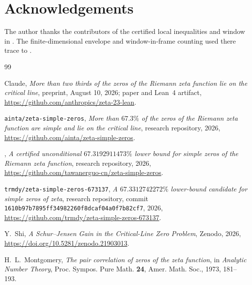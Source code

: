 \documentclass[11pt]{amsart}
\theoremstyle{remark}
\begin{document}
\section*{Acknowledgements}

The author thanks the contributors of the certified local inequalities and
window in \cite{Trmdy2026}.  The finite-dimensional envelope and
window-in-frame counting used there trace to \cite{Tawan2026}.

\begin{thebibliography}{99}

Claude,
\emph{More than two thirds of the zeros of the Riemann zeta function lie on
the critical line}, preprint, August 10, 2026; paper and Lean~4 artifact,
\url{https://github.com/anthropics/zeta-23-lean}.

\texttt{ainta/zeta-simple-zeros},
\emph{More than $67.3\%$ of the zeros of the Riemann zeta function are
simple and lie on the critical line}, research repository, 2026,
\url{https://github.com/ainta/zeta-simple-zeros}.

,
\emph{A certified unconditional $67.3192911473\%$ lower bound for simple
zeros of the Riemann zeta function}, research repository, 2026,
\url{https://github.com/tawanerguo-cn/zeta-simple-zeros}.

\texttt{trmdy/zeta-simple-zeros-673137},
\emph{A $67.3312742272\%$ lower-bound candidate for simple zeros of zeta},
research repository, commit
\texttt{1610b97b7895ff34982260f8dcaf04a0f7b82cf7}, 2026,
\url{https://github.com/trmdy/zeta-simple-zeros-673137}.

Y.~Shi,
\emph{A Schur--Jensen Gain in the Critical-Line Zero Problem},
Zenodo, 2026,
\url{https://doi.org/10.5281/zenodo.21903013}.

H.~L.~Montgomery,
\emph{The pair correlation of zeros of the zeta function}, in
\emph{Analytic Number Theory}, Proc. Sympos. Pure Math. \textbf{24},
Amer. Math. Soc., 1973, 181--193.

\end{thebibliography}
\end{document}
